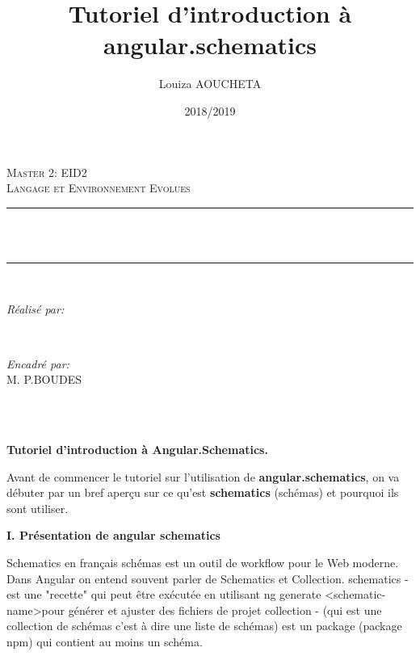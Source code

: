 \documentclass[12pt,french]{article}
\title{Tutoriel d'introduction à angular.schematics}
\author{Louiza AOUCHETA}
\date{2018/2019}
\makeatletter
\let\thetitle\@title
\let\theauthor\@author
\let\thedate\@date
\makeatother
\begin{document}

\begin{titlepage}
\centering 
    \vspace*{0.5 cm}
    \textsc{\LARGE Master 2: EID2}\\[2.0 cm]	
	\textsc{\large Langage et Environnement Evolues}\\[0.5 cm]			
	\rule{\linewidth}{0.2 mm} \\[0.4 cm]
	{ \huge \bfseries \thetitle}\\
	\rule{\linewidth}{0.2 mm} \\[1.5 cm]
	
	\begin{minipage}{0.4\textwidth}
		\begin{flushleft} \large
			\emph{Réalisé par:}\\
			\theauthor
			\end{flushleft}
			\end{minipage}~
			\begin{minipage}{0.4\textwidth}
			\begin{flushright} \large
			\emph{Encadré par:} \\
			M. P.BOUDES								
		\end{flushright}
	\end{minipage}\\[2 cm]
	
	{\large \thedate}\\[2 cm]
 
	\vfill
	
\end{titlepage}

		\qquad\qquad\qquad\large{\textbf{Tutoriel d’introduction à Angular.Schematics.}}\newline
	
	Avant de commencer le tutoriel sur l'utilisation de \textbf{angular.schematics}, on va débuter par un bref aperçu sur ce qu'est \textbf{schematics} (schémas) et pourquoi ils sont utiliser.\newline
	
	\textbf{I. Présentation de angular schematics}\newline
	
	Schematics en français schémas est un outil de workflow pour le Web moderne.\newline
	Dans Angular on entend souvent parler de Schematics et Collection.\smallbreak
	schematics - est une "recette" qui peut être exécutée en utilisant ng generate <schematic-name>pour générer et ajuster des fichiers de projet\smallbreak
	collection - (qui est une collection de schémas c'est à dire une liste de schémas) est un package (package npm) qui contient au moins un schéma.\newline
	
\end{document}
